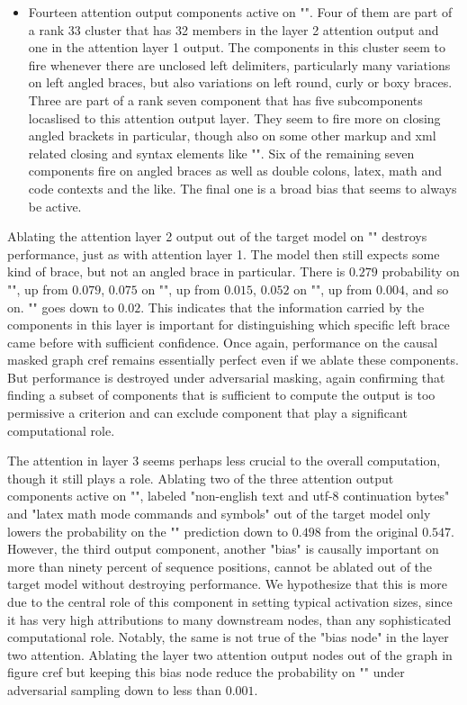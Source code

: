 \documentclass{article}
\begin{document}
\begin{itemize}
    \item{Fourteen attention output components active on "". Four of them are part of a rank 33 cluster that has 32 members in the layer 2 attention output and one in the attention layer 1 output. The components in this cluster seem to fire whenever there are unclosed left delimiters, particularly many variations on left angled braces, but also variations on left round, curly or boxy braces. Three are part of a rank seven component that has five subcomponents locaslised to this attention output layer. They seem to fire more on closing angled brackets in particular, though also on some other markup and xml related closing and syntax elements like "". Six of the remaining seven components fire on angled braces as well as double colons, latex, math and code contexts and the like. The final one is a broad bias that seems to always be active.}
\end{itemize} 
Ablating the attention layer 2 output out of the target model on "" destroys performance, just as with attention layer 1. The model then still expects some kind of brace, but not an angled brace in particular. There is $0.279$ probability on "\code{)}", up from $0.079$, $0.075$ on "\code{ ] }", up from $0.015$, $0.052$ on "\code{);}", up from $0.004$, and so on. "\code{>}" goes down to $0.02$. This indicates that the information carried by the components in this layer is important for distinguishing which specific left brace came before with sufficient confidence. Once again, performance on the causal masked graph cref remains essentially perfect even if we ablate these components. But performance is destroyed under adversarial masking, again confirming that finding a subset of components that is sufficient to compute the output is too permissive a criterion and can exclude component that play a significant computational role. 

The attention in layer 3 seems perhaps less crucial to the overall computation, though it still plays a role. Ablating two of the three attention output components active on "", labeled "non-english text and utf-8 continuation bytes" and "latex math mode commands and symbols" out of the target model only lowers the probability on the "\code{>}" prediction down to $0.498$ from the original $0.547$. However, the third output component, another "bias" is causally important on more than ninety percent of sequence positions, cannot be ablated out of the target model without destroying performance. We hypothesize that this is more due to the central role of this component in setting typical activation sizes, since it has very high attributions to many downstream nodes, than any sophisticated computational role. Notably, the same is not true of the "bias node" in the layer two attention. Ablating the layer two attention output nodes out of the graph in figure cref but keeping this bias node reduce the probability on "\code{>}" under adversarial sampling down to less than $0.001$.  
\end{document}
